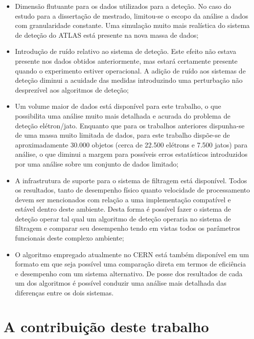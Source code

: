 \begin{itemize}
\item Dimensão flutuante para os dados utilizados para a deteção. No caso do
estudo para a dissertação de mestrado, limitou-se o escopo da análise a dados
com granularidade constante. Uma simulação muito mais realística do sistema de
deteção do ATLAS está presente na nova massa de dados;

\item Introdução de ruído relativo ao sistema de deteção. Este efeito não
estava presente nos dados obtidos anteriormente, mas estará certamente
presente quando o experimento estiver operacional. A adição de ruído aos
sistemas de deteção diminui a acuidade das medidas introduzindo uma
perturbação não desprezível aos algoritmos de deteção;

\item Um volume maior de dados está disponível para este trabalho, o que
possibilita uma análise muito mais detalhada e acurada do problema de deteção
elétron/jato. Enquanto que para os trabalhos anteriores dispunha-se de uma
massa muito limitada de dados, para este trabalho dispõe-se de aproximadamente
30.000 objetos (cerca de 22.500 elétrons e 7.500 jatos) para análise, o que
diminui a margem para possíveis erros estatísticos introduzidos por uma
análise sobre um conjunto de dados limitado;

\item A infrastrutura de suporte para o sistema de filtragem está
disponível. Todos os resultados, tanto de desempenho físico quanto velocidade
de processamento devem ser mencionados com relação a uma implementação
compatível e estável dentro deste ambiente. Desta forma é possível fazer o
sistema de deteção operar tal qual um algoritmo de deteção operaria no sistema
de filtragem e comparar seu desempenho tendo em vistas todos os parâmetros
funcionais deste complexo ambiente;

\item O algoritmo empregado atualmente no CERN está também disponível em um
formato em que seja possível uma comparação direta em termos de eficiência e
desempenho com um sistema alternativo. De posse dos resultados de cada um dos
algoritmos é possível conduzir uma análise mais detalhada das diferenças entre
os dois sistemas.
\end{itemize}

\section{A contribuição deste trabalho}

